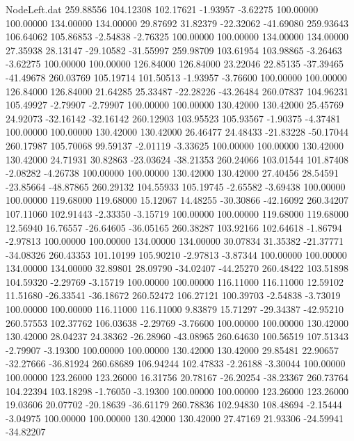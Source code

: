 \begin{filecontents}{NodeLeft.dat}
 259.88556  104.12308  102.17621    -1.93957   -3.62275  100.00000  100.00000  134.00000  134.00000   29.87692   31.82379  -22.32062  -41.69080
 259.93643  106.64062  105.86853    -2.54838   -2.76325  100.00000  100.00000  134.00000  134.00000   27.35938   28.13147  -29.10582  -31.55997
 259.98709  103.61954  103.98865    -3.26463   -3.62275  100.00000  100.00000  126.84000  126.84000   23.22046   22.85135  -37.39465  -41.49678
 260.03769  105.19714  101.50513    -1.93957   -3.76600  100.00000  100.00000  126.84000  126.84000   21.64285   25.33487  -22.28226  -43.26484
 260.07837  104.96231  105.49927    -2.79907   -2.79907  100.00000  100.00000  130.42000  130.42000   25.45769   24.92073  -32.16142  -32.16142
 260.12903  103.95523  105.93567    -1.90375   -4.37481  100.00000  100.00000  130.42000  130.42000   26.46477   24.48433  -21.83228  -50.17044
 260.17987  105.70068   99.59137    -2.01119   -3.33625  100.00000  100.00000  130.42000  130.42000   24.71931   30.82863  -23.03624  -38.21353
 260.24066  103.01544  101.87408    -2.08282   -4.26738  100.00000  100.00000  130.42000  130.42000   27.40456   28.54591  -23.85664  -48.87865
 260.29132  104.55933  105.19745    -2.65582   -3.69438  100.00000  100.00000  119.68000  119.68000   15.12067   14.48255  -30.30866  -42.16092
 260.34207  107.11060  102.91443    -2.33350   -3.15719  100.00000  100.00000  119.68000  119.68000   12.56940   16.76557  -26.64605  -36.05165
 260.38287  103.92166  102.64618    -1.86794   -2.97813  100.00000  100.00000  134.00000  134.00000   30.07834   31.35382  -21.37771  -34.08326
 260.43353  101.10199  105.90210    -2.97813   -3.87344  100.00000  100.00000  134.00000  134.00000   32.89801   28.09790  -34.02407  -44.25270
 260.48422  103.51898  104.59320    -2.29769   -3.15719  100.00000  100.00000  116.11000  116.11000   12.59102   11.51680  -26.33541  -36.18672
 260.52472  106.27121  100.39703    -2.54838   -3.73019  100.00000  100.00000  116.11000  116.11000    9.83879   15.71297  -29.34387  -42.95210
 260.57553  102.37762  106.03638    -2.29769   -3.76600  100.00000  100.00000  130.42000  130.42000   28.04237   24.38362  -26.28960  -43.08965
 260.64630  100.56519  107.51343    -2.79907   -3.19300  100.00000  100.00000  130.42000  130.42000   29.85481   22.90657  -32.27666  -36.81924
 260.68689  106.94244  102.47833    -2.26188   -3.30044  100.00000  100.00000  123.26000  123.26000   16.31756   20.78167  -26.20254  -38.23367
 260.73764  104.22394  103.18298    -1.76050   -3.19300  100.00000  100.00000  123.26000  123.26000   19.03606   20.07702  -20.18639  -36.61179
 260.78836  102.94830  108.48694    -2.15444   -3.04975  100.00000  100.00000  130.42000  130.42000   27.47169   21.93306  -24.59941  -34.82207

\end{filecontents}
